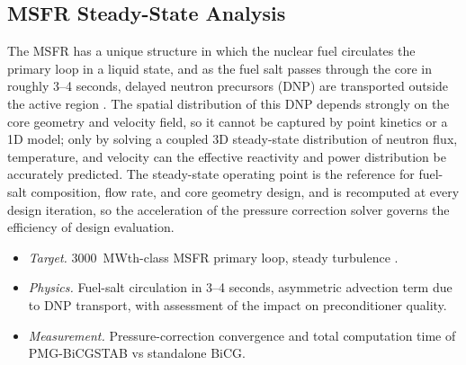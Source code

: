 \documentclass[review]{elsarticle}
\begin{document}
\subsection{MSFR Steady-State Analysis}
\label{Section:MSFR}
The MSFR has a unique structure in which the nuclear fuel circulates the primary loop in a liquid state, and as the fuel salt passes through the core in roughly 3--4 seconds, delayed neutron precursors (DNP) are transported outside the active region \cite{msfr_coupled}. The spatial distribution of this DNP depends strongly on the core geometry and velocity field, so it cannot be captured by point kinetics or a 1D model; only by solving a coupled 3D steady-state distribution of neutron flux, temperature, and velocity can the effective reactivity and power distribution be accurately predicted. The steady-state operating point is the reference for fuel-salt composition, flow rate, and core geometry design, and is recomputed at every design iteration, so the acceleration of the pressure correction solver governs the efficiency of design evaluation.
\begin{itemize}
  \item \emph{Target.} 3000~MWth-class MSFR primary loop, steady turbulence \cite{msfr_coupled}.
  \item \emph{Physics.} Fuel-salt circulation in 3--4 seconds, asymmetric advection term due to DNP transport, with assessment of the impact on preconditioner quality.
  \item \emph{Measurement.} Pressure-correction convergence and total computation time of PMG-BiCGSTAB vs standalone BiCG.
\end{itemize}
\end{document}
